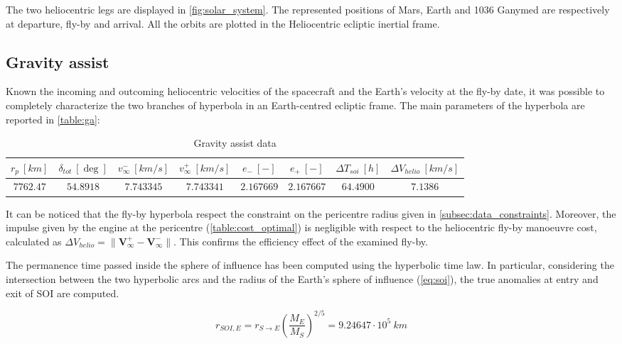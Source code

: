 The two heliocentric legs are displayed in \autoref{fig:solar_system}. The represented positions of Mars, Earth and 1036 Ganymed are respectively at departure, fly-by and arrival. All the orbits are plotted in the Heliocentric ecliptic inertial frame.
\subsection{Gravity assist}
\label{subsec:ga}

Known the incoming and outcoming heliocentric velocities of the spacecraft and the Earth's velocity at the fly-by date, it was possible to completely characterize the two branches of hyperbola in an Earth-centred ecliptic frame. The main parameters of the hyperbola are reported in \autoref{table:ga}:

\begin{table}[H]

    \centering
    \begin{tabular}{|c|c|c|c|c|c|c|c|}
    \hline
    $r_p \ [km]$ &  $\delta _{tot} \ [\deg]$ & $v_{\infty}^{-} \ [km/s]$ & $v_{\infty}^{+} \ [km/s]$ & $e_{-} \ [-]$ & $e_{+} \ [-]$ & $\Delta T_{soi} \ [h]$ & $\Delta V_{helio} \ [km/s]$ \\
    \hline
    $7762.47$ &  $54.8918$ & $7.743345$ & $7.743341$ & $2.167669$ & $2.167667$ & $64.4900$ & $7.1386$ \\
    \hline
    \end{tabular}
    
    \caption{Gravity assist data}
    \label{table:ga} 
\end{table}

It can be noticed that the fly-by hyperbola respect the constraint on the pericentre radius given in \autoref{subsec:data_constraints}. Moreover, the impulse given by the engine at the pericentre (\autoref{table:cost_optimal}) is negligible with respect to the heliocentric fly-by manoeuvre cost, calculated as $\Delta V_{helio} = \lVert\boldsymbol{V_{\infty}^{+} - V_{\infty}^{-}} \rVert$. This confirms the efficiency effect of the examined fly-by. 

The permanence time passed inside the sphere of influence has been computed using the hyperbolic time law. In particular, considering the intersection between the two hyperbolic arcs and the radius of the Earth's sphere of influence (\autoref{eq:soi}), the true anomalies at entry and exit of SOI are computed.

\begin{equation}
    \label{eq:soi}
r_{SOI,E} = r_{S \to E}\left(\frac{M_E}{M_S}\right)^{2/5} = 9.24647 \cdot 10^{5} \ km
\end{equation}

